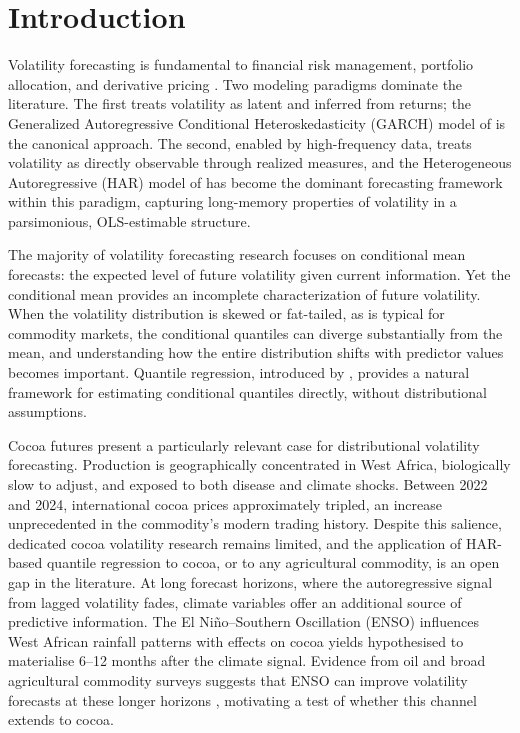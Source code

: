 \section{Introduction}
\label{sec:introduction}

Volatility forecasting is fundamental to financial risk management, portfolio
allocation, and derivative pricing \parencite{poonForecastingVolatilityFinancial}.
Two modeling paradigms dominate the literature. The first treats volatility as
latent and inferred from returns; the Generalized Autoregressive Conditional
Heteroskedasticity (GARCH) model of \textcite{bollerslev1986generalized} is the
canonical approach. The second, enabled by high-frequency data, treats volatility
as directly observable through realized measures, and the Heterogeneous
Autoregressive (HAR) model of \textcite{corsiSimpleApproximateLongMemory2008}
has become the dominant forecasting framework within this paradigm, capturing
long-memory properties of volatility in a parsimonious, OLS-estimable structure.

The majority of volatility forecasting research focuses on conditional mean
forecasts: the expected level of future volatility given current information.
Yet the conditional mean provides an incomplete characterization of future
volatility. When the volatility distribution is skewed or fat-tailed, as
is typical for commodity markets, the conditional quantiles can diverge
substantially from the mean, and understanding how the entire distribution
shifts with predictor values becomes important. Quantile regression,
introduced by \textcite{koenker1978regression}, provides a natural framework
for estimating conditional quantiles directly, without distributional
assumptions.

Cocoa futures present a particularly relevant case for distributional volatility
forecasting. Production is geographically concentrated in West Africa, biologically
slow to adjust, and exposed to both disease and climate shocks. Between 2022 and
2024, international cocoa prices approximately tripled, an increase unprecedented
in the commodity's modern trading history. Despite this salience, dedicated cocoa
volatility research remains limited, and the application of HAR-based quantile
regression to cocoa, or to any agricultural commodity, is an open gap in the
literature. At long forecast horizons, where the autoregressive signal from
lagged volatility fades, climate variables offer an additional source of
predictive information. The El Ni\~no--Southern Oscillation (ENSO) influences
West African rainfall patterns with effects on cocoa yields hypothesised to materialise
6--12 months after the climate signal. Evidence from oil and broad agricultural
commodity surveys suggests that ENSO can improve volatility forecasts at these
longer horizons \parencite{bouriNinoForecastabilityOilprice2021,
bonatoNinoNinaForecastability2023}, motivating a test of whether this channel
extends to cocoa.

